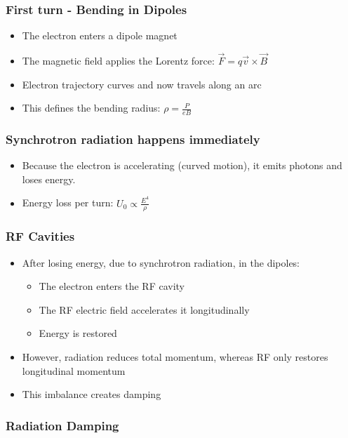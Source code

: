 \documentclass{article}
\begin{document}
\subsubsection{First turn - Bending in Dipoles}
\begin{itemize}
\item The electron enters a dipole magnet
\item The magnetic field applies the Lorentz force: $\vec{F}=q\vec{v}\times \vec{B}$
\item Electron trajectory curves and now travels along an arc
\item This defines the bending radius: $\rho=\frac{P}{eB}$
\end{itemize}

\subsubsection{Synchrotron radiation happens immediately}
\begin{itemize}
\item Because the electron is accelerating (curved motion), it emits photons and loses energy.
\item Energy loss per turn: $U_0\propto \frac{E^4}{\rho}$
\end{itemize}

\subsubsection{RF Cavities}

\begin{itemize}
\item After losing energy, due to synchrotron radiation, in the dipoles:
    \begin{itemize}
    \item The electron enters the RF cavity
    \item The RF electric field accelerates it longitudinally 
    \item Energy is restored
    \end{itemize}
\item However, radiation reduces total momentum, whereas RF only restores longitudinal momentum
\item This imbalance creates damping
\end{itemize}

\subsubsection{Radiation Damping}
\end{document}
